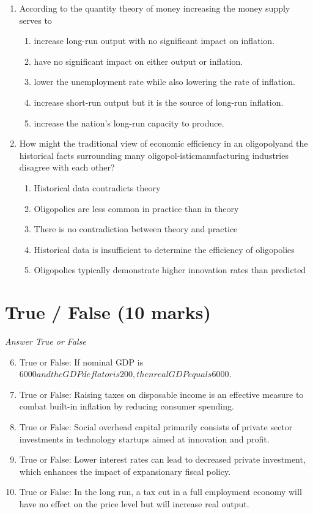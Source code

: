 \documentclass[12pt]{article}
\begin{document}
\begin{enumerate}[label=\arabic*.]
\begin{enumerate}[label=(\alph*)]
\end{enumerate}
\item According to the quantity theory of money increasing the money supply serves to
\begin{enumerate}[label=(\alph*)]
    \item increase long-run output with no significant impact on inflation.
    \item have no significant impact on either output or inflation.
    \item lower the unemployment rate while also lowering the rate of inflation.
    \item increase short-run output but it is the source of long-run inflation.
    \item increase the nation's long-run capacity to produce.
\end{enumerate}
\item How might the traditional view of economic efficiency in an oligopolyand the historical facts surrounding many oligopol-isticmanufacturing industries disagree with each other?
\begin{enumerate}[label=(\alph*)]
    \item Historical data contradicts theory
    \item Oligopolies are less common in practice than in theory
    \item There is no contradiction between theory and practice
    \item Historical data is insufficient to determine the efficiency of oligopolies
    \item Oligopolies typically demonstrate higher innovation rates than predicted
\end{enumerate}
\end{enumerate}

\section*{True / False (10 marks)}
\textit{Answer True or False}
\begin{enumerate}[label=\arabic*.]
\setcounter{enumi}{5}
\item True or False: If nominal GDP is $6000 and the GDP deflator is 200, then real GDP equals $6000.
\item True or False: Raising taxes on disposable income is an effective measure to combat built-in inflation by reducing consumer spending.
\item True or False: Social overhead capital primarily consists of private sector investments in technology startups aimed at innovation and profit.
\item True or False: Lower interest rates can lead to decreased private investment, which enhances the impact of expansionary fiscal policy.
\item True or False: In the long run, a tax cut in a full employment economy will have no effect on the price level but will increase real output.
\end{enumerate}
\end{document}
